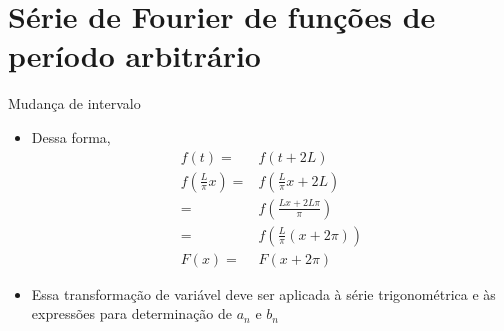 
      \section[ slide = true]{Série de Fourier de funções de período arbitrário}
      \begin{slide}[toc=]{Mudança de intervalo}
		 {\pause
		      \begin{itemize}
			      \item Dessa forma,
				      \begin{align*}
					      f(t)                           =& f(t+2L)\\
					      f\left (\frac{L}{\pi}x\right ) =& f\left (\frac{L}{\pi}x+2L\right )\\
					                                     =& f\left (\frac{Lx + 2L\pi}{\pi}\right ) \\
									     =& f\left (\frac{L}{\pi}(x+2\pi)\right )\\
						 F(x)                        =& F(x+2\pi)
				      \end{align*}\pause
			      \item Essa transformação de variável deve ser aplicada à série trigonométrica e às expressões para determinação de $a_n$ e $b_n$
		      \end{itemize}}
      \end{slide}
      
